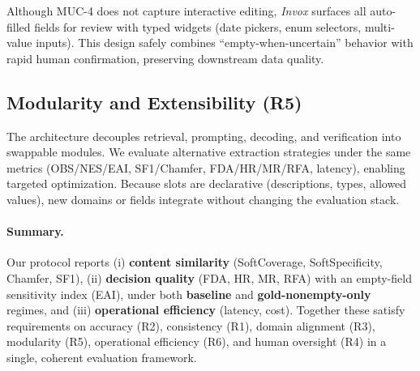 Although MUC-4 does not capture interactive editing, \textit{Invox} surfaces all auto-filled fields for review with typed widgets (date pickers, enum selectors, multi-value inputs). 
This design safely combines ``empty-when-uncertain'' behavior with rapid human confirmation, preserving downstream data quality.

\subsection{Modularity and Extensibility (R5)}
\label{subsec:modularity}

The architecture decouples retrieval, prompting, decoding, and verification into swappable modules. 
We evaluate alternative extraction strategies under the same metrics (OBS/NES/EAI, SF1/Chamfer, FDA/HR/MR/RFA, latency), enabling targeted optimization. 
Because slots are declarative (descriptions, types, allowed values), new domains or fields integrate without changing the evaluation stack.

\paragraph{Summary.}
Our protocol reports (i) \textbf{content similarity} (SoftCoverage, SoftSpecificity, Chamfer, SF1), (ii) \textbf{decision quality} (FDA, HR, MR, RFA) with an empty-field sensitivity index (EAI), under both \textbf{baseline} and \textbf{gold-nonempty-only} regimes, and (iii) \textbf{operational efficiency} (latency, cost). 
Together these satisfy requirements on accuracy (R2), consistency (R1), domain alignment (R3), modularity (R5), operational efficiency (R6), and human oversight (R4) in a single, coherent evaluation framework.
